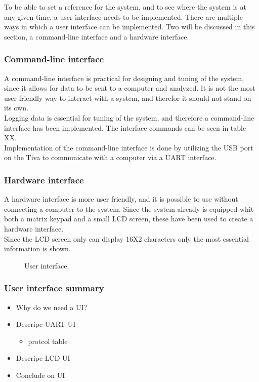 \documentclass[../../../main]{subfiles}
\begin{document}
To be able to set a reference for the system, and to see where the system is at any given time, a user interface needs to be implemented.
There are multiple ways in which a user interface can be implemented. 
Two will be discussed in this section, a command-line interface and a hardware interface.

\subsubsection{Command-line interface}%
\label{ssub:command-line_interface}
A command-line interface is practical for designing and tuning of the system, since it allows for data to be sent to a computer and analyzed.
It is not the most user friendly way to interact with a system, and therefor it should not stand on its own.
\\
Logging data is essential for tuning of the system, and therefore a command-line interface has been implemented. 
The interface commands can be seen in table XX. 
\\
Implementation of the command-line interface is done by utilizing the USB port on the Tiva to communicate with a computer via a UART interface.  

\subsubsection{Hardware interface}%
\label{ssub:hardware_interface}
A hardware interface is more user friendly, and it is possible to use without connecting a computer to the system. 
Since the system already is equipped whit both a matrix keypad and a small LCD screen, these have been used to create a hardware interface.
\\
Since the LCD screen only can display 16X2 characters only the most essential information is shown.


\begin{figure}[H]
  \centering
  \def\svgwidth{\textwidth}
  
  \caption{User interface.}
  \label{fig:User_interface}
\end{figure}


\subsubsection{User interface summary}%
\label{ssub:user_interface_summary}



\begin{itemize}
    \item Why do we need a UI? 
    \item Descripe UART UI
        \begin{itemize}
            \item protcol table
        \end{itemize}
    \item Descripe LCD UI
    \item Conclude on UI 
\end{itemize}
\end{document}

